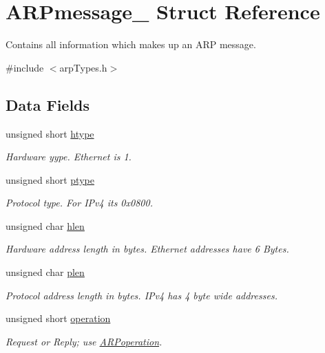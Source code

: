 \hypertarget{struct_a_r_pmessage__}{}\section{A\+R\+Pmessage\+\_\+ Struct Reference}
\label{struct_a_r_pmessage__}


Contains all information which makes up an A\+RP message.  




{\ttfamily \#include $<$arp\+Types.\+h$>$}

\subsection*{Data Fields}
\begin{DoxyCompactItemize}
\item 
unsigned short \mbox{\hyperlink{struct_a_r_pmessage___a46715ba000c9a625f4b6310f1f09afc7}{htype}}
\begin{DoxyCompactList}\small\item\em Hardware yype. Ethernet is 1. \end{DoxyCompactList}\item 
unsigned short \mbox{\hyperlink{struct_a_r_pmessage___a141d5699e3106d94bee5842b6b0d3e14}{ptype}}
\begin{DoxyCompactList}\small\item\em Protocol type. For I\+Pv4 it\textquotesingle{}s 0x0800. \end{DoxyCompactList}\item 
unsigned char \mbox{\hyperlink{struct_a_r_pmessage___a02328684750d50e609a16de43cbd46a7}{hlen}}
\begin{DoxyCompactList}\small\item\em Hardware address length in bytes. Ethernet addresses have 6 Bytes. \end{DoxyCompactList}\item 
unsigned char \mbox{\hyperlink{struct_a_r_pmessage___a3bdad4fbaa0d1a8b657090905c7b58ed}{plen}}
\begin{DoxyCompactList}\small\item\em Protocol address length in bytes. I\+Pv4 has 4 byte wide addresses. \end{DoxyCompactList}\item 
unsigned short \mbox{\hyperlink{struct_a_r_pmessage___a9d6488f4b1701ea19f48f8c589c525cc}{operation}}
\begin{DoxyCompactList}\small\item\em Request or Reply; use \mbox{\hyperlink{group__arp_ga051b3dc0fecaa617590192d2fb74688a}{A\+R\+Poperation}}. \end{DoxyCompactList}\item 

\end{DoxyCompactItemize}
